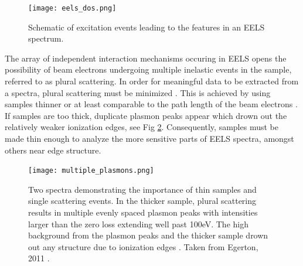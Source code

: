 \begin{figure}
	\centering
	\texttt{[image: eels\_dos.png]}
	\caption{Schematic of excitation events leading to the features in an EELS spectrum.   }
	\label{eels_dos}
\end{figure}


The array of independent interaction mechanisms occuring in EELS opens the possibility of beam electrons undergoing multiple inelastic events in the sample, referred to as plural scattering.  In order for meaningful data to be extracted from a spectra, plural scattering must be minimized \cite{Egerton}. This is achieved by using samples thinner or at least comparable to the path length of the beam electrons \cite{Egerton}.  If samples are too thick, duplicate plasmon peaks appear which  drown out the relatively weaker ionization edges, see Fig \ref{multiple_plasmons}.   Consequently, samples must be made thin enough to analyze the more sensitive parts of EELS spectra, amongst others near edge structure. \\

\begin{figure}
	\centering
	\texttt{[image: multiple\_plasmons.png]}
	\caption{Two spectra demonstrating the importance of thin samples and single scattering events. In the thicker sample, plural scattering results in multiple evenly spaced plasmon peaks with  intensities larger than the zero loss extending well past 100eV.  The high background from the plasmon peaks and the thicker sample drown out any structure due to ionization edges \cite{Egerton}. Taken from Egerton, 2011 \cite{Egerton}.}
	\label{multiple_plasmons}
\end{figure}






